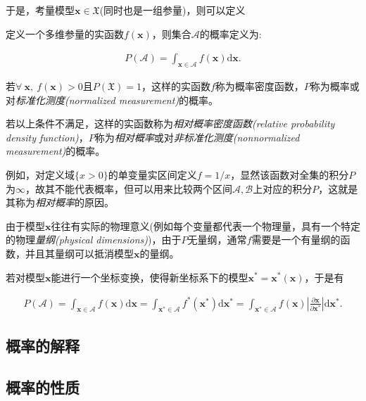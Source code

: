 于是，考量模型$\mathbf{x}\in\mathfrak{X}$(同时也是一组参量)，则可以定义

\begin{definition}[模型集的概率]
  定义一个多维参量的实函数$f(\mathbf{x})$，则集合$\mathcal{A}$的概率定义为:
  
  \begin{align} \label{fml:c1:probmodelset}
    P(\mathcal{A}) = \int_{\mathbf{x}\in\mathcal{A}}{f(\mathbf{x})\mathrm{d}\mathbf{x}}.
  \end{align}
  
  若$\forall~\mathbf{x},~f(\mathbf{x})>0$且$P(\mathfrak{X})=1$，这样的实函数$f$称为概率密度函数，$P$称为概率或对\emph{标准化测度(normalized measurement)}的概率。
  
  若以上条件不满足，这样的实函数称为\emph{相对概率密度函数(relative probability density function)}，$P$称为\emph{相对概率}或对\emph{非标准化测度(nonnormalized measurement)}的概率。
\end{definition}

例如，对定义域$\{x>0\}$的单变量实区间定义$f=1/x$，显然该函数对全集的积分$P$为$\infty$，故其不能代表概率，但可以用来比较两个区间$\mathcal{A},\mathcal{B}$上对应的积分$P$，这就是其称为\emph{相对概率}的原因。

由于模型$\mathbf{x}$往往有实际的物理意义(例如每个变量都代表一个物理量，具有一个特定的物理\emph{量纲(physical dimensions)})，由于$P$无量纲，通常$f$需要是一个有量纲的函数，并且其量纲可以抵消模型$\mathbf{x}$的量纲。

若对模型$\mathbf{x}$能进行一个坐标变换，使得新坐标系下的模型$\mathbf{x}^{\ast}=\mathbf{x}^{\ast}(\mathbf{x})$，于是有

\begin{align} \label{fml:c1:probchangecoor}
  P(\mathcal{A}) = \int_{\mathbf{x}\in\mathcal{A}}{f(\mathbf{x})\mathrm{d}\mathbf{x}} = \int_{\mathbf{x}^{\ast}\in\mathcal{A}}{f^{\ast}(\mathbf{x}^{\ast})\mathrm{d}\mathbf{x}^{\ast}} = \int_{\mathbf{x}^{\ast}\in\mathcal{A}}{f(\mathbf{x})\left|\frac{\partial \mathbf{x}}{\partial \mathbf{x}^{\ast}}\right|\mathrm{d}\mathbf{x}^{\ast}}.
\end{align}

\subsection{概率的解释}

\subsection{概率的性质}